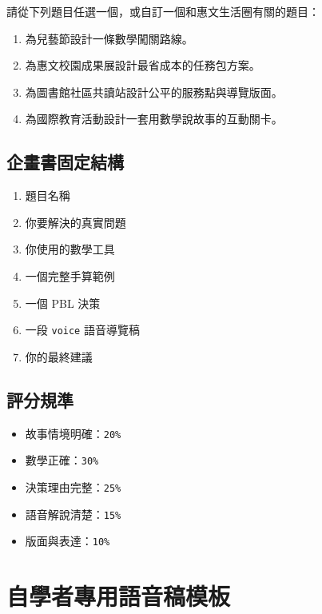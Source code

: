 \documentclass[
  chinese,
  12pt,
  a4paper,
  oneside]{article}
\providecommand{\tightlist}{%
  \setlength{\itemsep}{0pt}\setlength{\parskip}{0pt}}
\begin{document}
請從下列題目任選一個，或自訂一個和惠文生活圈有關的題目：

\begin{enumerate}
\def\labelenumi{\arabic{enumi}.}
\tightlist
\item
  為兒藝節設計一條數學闖關路線。
\item
  為惠文校園成果展設計最省成本的任務包方案。
\item
  為圖書館社區共讀站設計公平的服務點與導覽版面。
\item
  為國際教育活動設計一套用數學說故事的互動關卡。
\end{enumerate}

\subsection{企畫書固定結構}\label{ux4f01ux756bux66f8ux56faux5b9aux7d50ux69cb}

\begin{enumerate}
\def\labelenumi{\arabic{enumi}.}
\tightlist
\item
  題目名稱
\item
  你要解決的真實問題
\item
  你使用的數學工具
\item
  一個完整手算範例
\item
  一個 PBL 決策
\item
  一段 \texttt{voice} 語音導覽稿
\item
  你的最終建議
\end{enumerate}

\subsection{評分規準}\label{ux8a55ux5206ux898fux6e96}

\begin{itemize}
\tightlist
\item
  故事情境明確：\texttt{20\%}
\item
  數學正確：\texttt{30\%}
\item
  決策理由完整：\texttt{25\%}
\item
  語音解說清楚：\texttt{15\%}
\item
  版面與表達：\texttt{10\%}
\end{itemize}

\newpage

\section{自學者專用語音稿模板}\label{ux81eaux5b78ux8005ux5c08ux7528ux8a9eux97f3ux7a3fux6a21ux677f}
\end{document}
